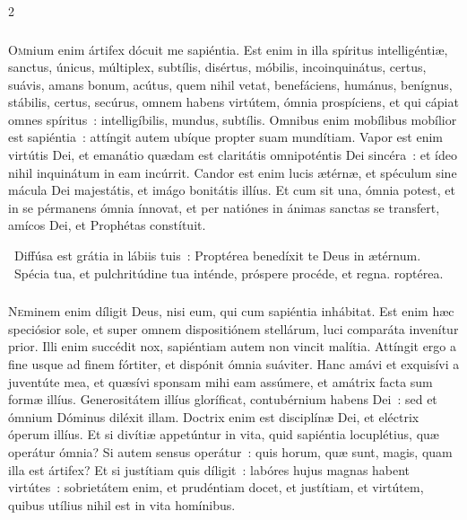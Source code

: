 \documentclass[9pt,twoside]{extarticle}
\begin{document}
\begin{multicols}{2}
{\subsubsection*{\center {}}
\lettrine{O}mnium enim ártifex dócuit me sapiéntia. Est enim in illa spíritus intelligéntiæ, sanctus, únicus, múltiplex, subtílis, disértus, móbilis, incoinquinátus, certus, suávis, amans bonum, acútus, quem nihil vetat, benefáciens, humánus, benígnus, stábilis, certus, secúrus, omnem habens virtútem, ómnia prospíciens, et qui cápiat omnes spíritus~: intelligíbilis, mundus, subtílis. Omnibus enim mobílibus mobílior est sapiéntia~: attíngit autem ubíque propter suam mundítiam. Vapor est enim virtútis Dei, et emanátio quædam est claritátis omnipoténtis Dei sincéra~: et ídeo nihil inquinátum in eam incúrrit. Candor est enim lucis ætérnæ, et spéculum sine mácula Dei majestátis, et imágo bonitátis illíus. Et cum sit una, ómnia potest, et in se pérmanens ómnia ínnovat, et per natiónes in ánimas sanctas se transfert, amícos Dei, et Prophétas constítuit.

\begin{tightlist}{}
\item {}~Diffúsa est grátia in lábiis tuis~: \textred{*} Proptérea benedíxit te Deus in ætérnum. ~Spécia tua, et pulchritúdine tua inténde, próspere procéde, et regna. roptérea.
\end{tightlist}

\subsubsection*{\center {}}
\lettrine{N}eminem enim díligit Deus, nisi eum, qui cum sapiéntia inhábitat. Est enim hæc speciósior sole, et super omnem dispositiónem stellárum, luci comparáta invenítur prior. Illi enim succédit nox, sapiéntiam autem non vincit malítia. Attíngit ergo a fine usque ad finem fórtiter, et dispónit ómnia suáviter. Hanc amávi et exquisívi a juventúte mea, et quæsívi sponsam mihi eam assúmere, et amátrix facta sum formæ illíus. Generositátem illíus gloríficat, contubérnium habens Dei~: sed et ómnium Dóminus diléxit illam. Doctrix enim est disciplínæ Dei, et eléctrix óperum illíus. Et si divítiæ appetúntur in vita, quid sapiéntia locuplétius, quæ operátur ómnia? Si autem sensus operátur~: quis horum, quæ sunt, magis, quam illa est ártifex? Et si justítiam quis díligit~: labóres hujus magnas habent virtútes~: sobrietátem enim, et prudéntiam docet, et justítiam, et virtútem, quibus utílius nihil est in vita homínibus.

}
\end{multicols}
\end{document}
